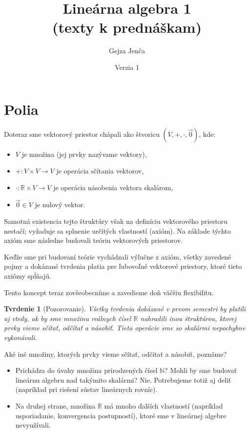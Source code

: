 \documentclass[11pt,a4paper]{article}
\theoremstyle{definition}
\theoremstyle{plain}
\newtheorem{tvrdenie}[definicia]{Tvrdenie}
\theoremstyle{remark}
\newcommand{\Nat}{\mathbb{N}}
\newcommand{\R}{\mathbb{R}}
\begin{document}
\title{Lineárna algebra 1\\(texty k prednáškam)}
\author{Gejza Jenča}
\date{Verzia 1}
\maketitle
\tableofcontents

\section{Polia}

Doteraz sme vektorový priestor chápali ako štvoricu $(V, +, \cdot, \vec{0})$, kde:
\begin{itemize}
    \item $V$ je množina (jej prvky nazývame vektory),
    \item $+: V \times V \to V$ je operácia sčítania vektorov,
    \item $\cdot: \R \times V \to V$ je operácia násobenia vektora skalárom,
    \item $\vec{0} \in V$ je nulový vektor.
\end{itemize}

Samotná existencia tejto štruktúry však na definíciu vektorového priestoru nestačí; vyžaduje sa splnenie určitých vlastností (axióm). Na základe týchto axióm sme následne budovali teóriu vektorových priestorov.

Keďže sme pri budovaní teórie vychádzali výlučne z axióm, všetky zavedené pojmy a dokázané tvrdenia platia pre ľubovoľné vektorové priestory, ktoré tieto axiómy spĺňajú.

Tento koncept teraz zovšeobecníme a zavedieme doň väčšiu flexibilitu.

\begin{tvrdenie}[Pozorovanie]
Všetky tvrdenia dokázané v prvom semestri by platili aj vtedy, ak by sme množinu reálnych čísel $\R$ nahradili inou štruktúrou, ktorej prvky vieme sčítať, odčítať a násobiť. Tieto operácie sme so skalármi nepochybne vykonávali.
\end{tvrdenie}

Aké iné množiny, ktorých prvky vieme sčítať, odčítať a násobiť, poznáme?
\begin{itemize}
    \item Prichádza do úvahy množina prirodzených čísel $\Nat$? Mohli by sme budovať lineárnu algebru nad takýmito skalármi? Nie. Potrebujeme totiž aj deliť (napríklad pri riešení sústav lineárnych rovníc).
    \item Na druhej strane, množina $\R$ má mnoho ďalších vlastností (napríklad usporiadanie, konvergencia postupností), ktoré sme v lineárnej algebre nevyužívali.
\end{itemize}
\end{document}

